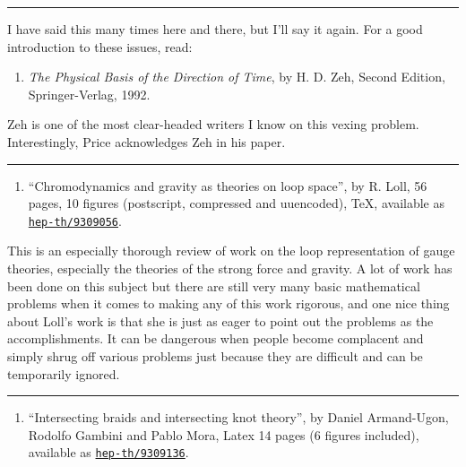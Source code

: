 \documentclass{article}
\def\tightlist{}
\begin{document}
\begin{center}\rule{0.5\linewidth}{0.5pt}\end{center}

I have said this many times here and there, but I'll say it again. For a
good introduction to these issues, read:

\begin{enumerate}
\def\labelenumi{\arabic{enumi})}
\setcounter{enumi}{1}
\tightlist
\item
  \emph{The Physical Basis of the Direction of Time}, by H. D. Zeh,
  Second Edition, Springer-Verlag, 1992.
\end{enumerate}

Zeh is one of the most clear-headed writers I know on this vexing
problem. Interestingly, Price acknowledges Zeh in his paper.

\begin{center}\rule{0.5\linewidth}{0.5pt}\end{center}

\begin{enumerate}
\def\labelenumi{\arabic{enumi})}
\setcounter{enumi}{2}
\tightlist
\item
  ``Chromodynamics and gravity as theories on loop space'', by R. Loll,
  56 pages, 10 figures (postscript, compressed and uuencoded), TeX,
  available as
  \href{http://xxx.lanl.gov/abs/hep-th/9309056}{\texttt{hep-th/9309056}}.
\end{enumerate}

This is an especially thorough review of work on the loop representation
of gauge theories, especially the theories of the strong force and
gravity. A lot of work has been done on this subject but there are still
very many basic mathematical problems when it comes to making any of
this work rigorous, and one nice thing about Loll's work is that she is
just as eager to point out the problems as the accomplishments. It can
be dangerous when people become complacent and simply shrug off various
problems just because they are difficult and can be temporarily ignored.

\begin{center}\rule{0.5\linewidth}{0.5pt}\end{center}

\begin{enumerate}
\def\labelenumi{\arabic{enumi})}
\setcounter{enumi}{3}
\tightlist
\item
  ``Intersecting braids and intersecting knot theory'', by Daniel
  Armand-Ugon, Rodolfo Gambini and Pablo Mora, Latex 14 pages (6 figures
  included), available as
  \href{http://xxx.lanl.gov/abs/hep-th/9309136}{\texttt{hep-th/9309136}}.
\end{enumerate}
\end{document}
